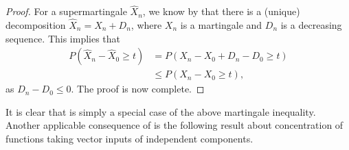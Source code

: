 \begin{proof}
For a supermartingale $\widehat{X}_n$, we know by  that there is a (unique) decomposition $\widehat{X}_n = X_n + D_n$, where $X_n$ is a martingale and $D_n$ is a decreasing sequence. This implies that \begin{align*}
    P(\widehat{X}_n - \widehat{X}_0 \geq t) & = P(X_n - X_0 + D_n - D_0 \geq t)\\
    & \leq P(X_n - X_0 \geq t),
\end{align*} as $D_n - D_0 \leq 0$. The proof is now complete.
\end{proof}

It is clear that  is simply a special case of the above martingale inequality. Another applicable consequence of  is the following result about concentration of functions taking vector inputs of independent components.

